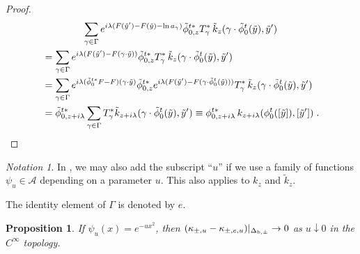 \documentclass{memo-l}
\theoremstyle{plain}
\newtheorem{prop}[thm]{Proposition}
\theoremstyle{definition}
\theoremstyle{remark}
\newtheorem{notation}[thm]{Notation}
\renewcommand{\AA}{\mathcal{A}}
\numberwithin{section}{chapter}
\numberwithin{equation}{section}%
\begin{document}
\begin{proof}
\begin{multline*}
\sum_{\gamma\in \Gamma} e^{i\lambda(F(\tilde y')-F(\tilde y)-\ln a_\gamma)} 
\tilde\phi_{0,z}^{t*}T_\gamma^*\,\tilde k_z(\gamma\cdot \tilde\phi_0^t(\tilde y),\tilde y')\\
\begin{aligned}
&= \sum_{\gamma\in \Gamma} e^{i\lambda (F(\tilde y')-F(\gamma\cdot \tilde y))}
\tilde\phi_{0,z}^{t*}T_\gamma^*\,\tilde k_z(\gamma\cdot\tilde\phi_0^t(\tilde y),\tilde y')\\
&= \sum_{\gamma\in \Gamma}e^{i\lambda  (\tilde\phi_0^{t*}F -F)(\gamma\cdot \tilde y)}\tilde\phi_{0,z}^{t*}    
e^{i\lambda (F(\tilde y')-F(\gamma\cdot\tilde\phi_0^t(\tilde y)))}T_\gamma^* \,\tilde k_z(\gamma\cdot
\tilde\phi_0^t(\tilde y),\tilde y') \\
&= \tilde\phi_{0,z+i\lambda}^{t*} \sum_{\gamma\in \Gamma}
T_\gamma^*\tilde k_{z+i\lambda}(\gamma\cdot \tilde\phi_0^t(\tilde y),\tilde y')
\equiv\phi_{0,z+i\lambda}^{t*}\,k_{z+i\lambda}(\phi_0^t([\tilde y]),[\tilde y'])\;.\qedhere
\end{aligned}
\end{multline*}
\end{proof}

\begin{notation}\label{n: subscript u}
In , we may also add the subscript ``$u$'' if we use a family of functions $\psi_u\in\AA$ depending on a parameter $u$. This also applies to $k_z$ and $\tilde k_z$.
\end{notation}

The identity element of $\Gamma$ is denoted by $e$.

\begin{prop}\label{p: (kappa_pm u - kappa_pm e u)|_Deltab to 0}
If $\psi_u(x)=e^{-ux^2}$, then $(\kappa_{\pm,u}-\kappa_{\pm,e,u})|_{\Delta_{\text{\rm b},\pm}}\to0$ as $u\downarrow0$ in the $C^\infty$ topology.
\end{prop}
\end{document}
